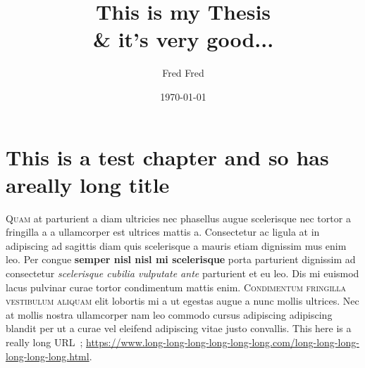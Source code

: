 \documentclass{fsthesis}
\begin{document}
\frontmatter
\title{This is my Thesis\\ \& it's very good...}
\author{Fred Fred}				%
\date{\today}%
\maketitle

\tableofcontents

\mainmatter


\chapter[Testing chapter]{This is a test chapter and so has areally long title}

\typeout{****}
\typeout{****}

\lettrine{Q}{uam} at parturient a diam ultricies nec phasellus augue scelerisque nec tortor a fringilla a a ullamcorper est ultrices mattis a. Consectetur ac ligula at in adipiscing ad sagittis diam quis scelerisque a mauris etiam dignissim mus enim leo. Per congue \textbf{semper nisl nisl mi scelerisque} porta parturient dignissim ad consectetur \textit{scelerisque cubilia vulputate ante} parturient et eu leo. \textsf{Dis mi euismod lacus pulvinar} curae tortor condimentum mattis enim. \textsc{Condimentum fringilla vestibulum aliquam} elit lobortis mi a ut egestas augue a nunc mollis ultrices. Nec at mollis nostra ullamcorper nam leo commodo cursus adipiscing adipiscing blandit per ut a curae vel eleifend adipiscing vitae justo convallis. This here is a really long URL~\citep{url-01}; \url{https://www.long-long-long-long-long-long.com/long-long-long-long-long-long.html}.
\end{document}
